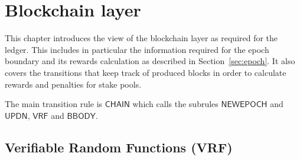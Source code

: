 \section{Blockchain layer}
\label{sec:chain}

This chapter introduces the view of the blockchain layer as required for the
ledger. This includes in particular the information required for the epoch
boundary and its rewards calculation as described in Section~\ref{sec:epoch}. It
also covers the transitions that keep track of produced blocks in order to
calculate rewards and penalties for stake pools.

The main transition rule is $\mathsf{CHAIN}$ which calls the subrules
$\mathsf{NEWEPOCH}$ and $\mathsf{UPDN}$, $\mathsf{VRF}$ and $\mathsf{BBODY}$.

\subsection{Verifiable Random Functions (VRF)}
\label{sec:defs-vrf}

